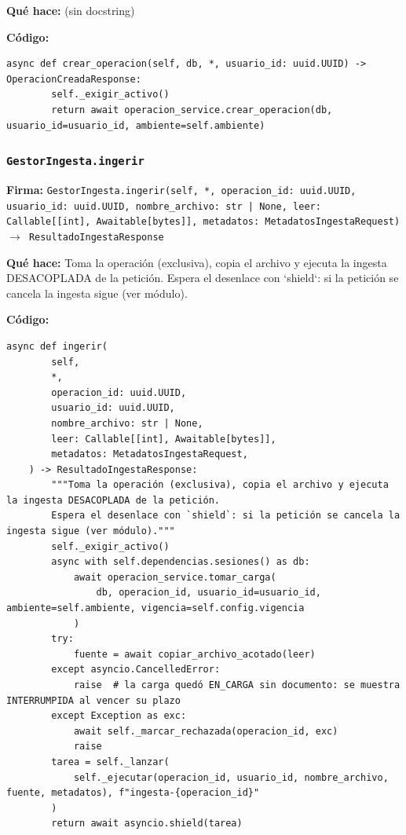 \documentclass[11pt,a4paper]{article}
\begin{document}
\textbf{Qué hace:} (sin docstring)

\textbf{Código:}
\begin{lstlisting}
async def crear_operacion(self, db, *, usuario_id: uuid.UUID) -> OperacionCreadaResponse:
        self._exigir_activo()
        return await operacion_service.crear_operacion(db, usuario_id=usuario_id, ambiente=self.ambiente)
\end{lstlisting}

\subsubsection*{\texttt{GestorIngesta.ingerir}}
\textbf{Firma:} \texttt{GestorIngesta.ingerir(self, *, operacion\_id: uuid.UUID, usuario\_id: uuid.UUID, nombre\_archivo: str | None, leer: Callable[[int], Awaitable[bytes]], metadatos: MetadatosIngestaRequest) $\rightarrow$ ResultadoIngestaResponse}

\textbf{Qué hace:} Toma la operación (exclusiva), copia el archivo y ejecuta la ingesta DESACOPLADA de la petición.
Espera el desenlace con `shield`: si la petición se cancela la ingesta sigue (ver módulo).

\textbf{Código:}
\begin{lstlisting}
async def ingerir(
        self,
        *,
        operacion_id: uuid.UUID,
        usuario_id: uuid.UUID,
        nombre_archivo: str | None,
        leer: Callable[[int], Awaitable[bytes]],
        metadatos: MetadatosIngestaRequest,
    ) -> ResultadoIngestaResponse:
        """Toma la operación (exclusiva), copia el archivo y ejecuta la ingesta DESACOPLADA de la petición.
        Espera el desenlace con `shield`: si la petición se cancela la ingesta sigue (ver módulo)."""
        self._exigir_activo()
        async with self.dependencias.sesiones() as db:
            await operacion_service.tomar_carga(
                db, operacion_id, usuario_id=usuario_id, ambiente=self.ambiente, vigencia=self.config.vigencia
            )
        try:
            fuente = await copiar_archivo_acotado(leer)
        except asyncio.CancelledError:
            raise  # la carga quedó EN_CARGA sin documento: se muestra INTERRUMPIDA al vencer su plazo
        except Exception as exc:
            await self._marcar_rechazada(operacion_id, exc)
            raise
        tarea = self._lanzar(
            self._ejecutar(operacion_id, usuario_id, nombre_archivo, fuente, metadatos), f"ingesta-{operacion_id}"
        )
        return await asyncio.shield(tarea)
\end{lstlisting}
\end{document}
